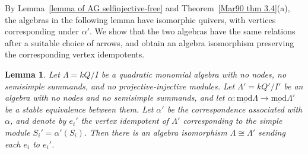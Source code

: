 \documentclass[11pt]{article}
\newcommand{\smod}{\operatorname{\underline{mod}}}
\providecommand{\varLambda}{\Lambda}
\newtheorem{lemma}[theorem]{Lemma}
\theoremstyle{definition}
\begin{document}
		By Lemma~\ref{lemma of AG selfinjective-free} and Theorem~\ref{Mar90 thm 3.4}(a), the algebras in the following lemma have isomorphic quivers, with vertices corresponding under $\alpha'$.
		We show that the two algebras have the same relations after a suitable choice of arrows, and obtain an algebra isomorphism preserving the corresponding vertex idempotents.

		\begin{lemma}\label{lemma of stable equivalences induces isomorphisms}
			Let $\varLambda=kQ/I$ be a quadratic monomial algebra with no nodes, no semisimple summands, and no projective-injective modules.
			Let $\varLambda'=kQ'/I'$ be an algebra with no nodes and no semisimple summands, and let $\alpha:\smod\varLambda\to\smod\varLambda'$ be a stable equivalence between them.
			Let $\alpha'$ be the correspondence associated with $\alpha$, and denote by $e_i'$ the vertex idempotent of $\varLambda'$ corresponding to the simple module $S_i'=\alpha'(S_i)$.
			Then there is an algebra isomorphism $\varLambda\cong\varLambda'$ sending each $e_i$ to $e_i'$.
		\end{lemma}
\end{document}
